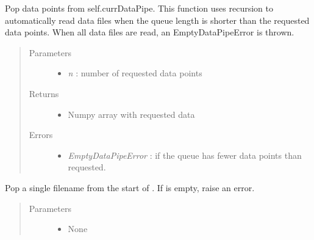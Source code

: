 \documentclass[letterpaper,10pt,english]{sphinxmanual}
\begin{document}
\begin{fulllineitems}
\begin{fulllineitems}
\end{fulllineitems}


\begin{fulllineitems}
\label{api-doc/mosaic.meta:mosaic.metaTrajIO.metaTrajIO.popdata}
Pop data points from self.currDataPipe. This function uses recursion 
to automatically read data files when the queue length is shorter
than the requested data points. When all data files are read, an
EmptyDataPipeError is thrown.
\begin{quote}\begin{description}
\item[{Parameters}] \leavevmode\begin{itemize}
\item {} 
\emph{n} : number of requested data points

\end{itemize}

\item[{Returns}] \leavevmode\begin{itemize}
\item {} 
Numpy array with requested data

\end{itemize}

\item[{Errors}] \leavevmode\begin{itemize}
\item {} 
\emph{EmptyDataPipeError} : if the queue has fewer data points than requested.

\end{itemize}

\end{description}\end{quote}

\end{fulllineitems}


\begin{fulllineitems}
\label{api-doc/mosaic.meta:mosaic.metaTrajIO.metaTrajIO.popfnames}
Pop a single filename from the start of . If  is empty,
raise an  error.
\begin{quote}\begin{description}
\item[{Parameters}] \leavevmode\begin{itemize}
\item {} 
None


\end{itemize}
\end{description}
\end{quote}
\end{fulllineitems}
\end{fulllineitems}
\end{document}
